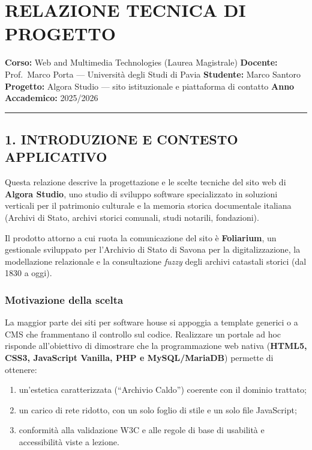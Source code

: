 \documentclass[
  11pt,
]{article}
\author{}
\date{}
\providecommand{\tightlist}{%
  \setlength{\itemsep}{0pt}\setlength{\parskip}{0pt}}
\begin{document}
\hypertarget{relazione-tecnica-di-progetto}{%
\section{RELAZIONE TECNICA DI
PROGETTO}\label{relazione-tecnica-di-progetto}}

\textbf{Corso:} Web and Multimedia Technologies (Laurea Magistrale)
\textbf{Docente:} Prof.~Marco Porta --- Università degli Studi di Pavia
\textbf{Studente:} Marco Santoro \textbf{Progetto:} Algora Studio ---
sito istituzionale e piattaforma di contatto \textbf{Anno Accademico:}
2025/2026

\begin{center}\rule{0.5\linewidth}{0.5pt}\end{center}

\hypertarget{introduzione-e-contesto-applicativo}{%
\subsection{1. INTRODUZIONE E CONTESTO
APPLICATIVO}\label{introduzione-e-contesto-applicativo}}

Questa relazione descrive la progettazione e le scelte tecniche del sito
web di \textbf{Algora Studio}, uno studio di sviluppo software
specializzato in soluzioni verticali per il patrimonio culturale e la
memoria storica documentale italiana (Archivi di Stato, archivi storici
comunali, studi notarili, fondazioni).

Il prodotto attorno a cui ruota la comunicazione del sito è
\textbf{Foliarium}, un gestionale sviluppato per l'Archivio di Stato di
Savona per la digitalizzazione, la modellazione relazionale e la
consultazione \emph{fuzzy} degli archivi catastali storici (dal 1830 a
oggi).

\hypertarget{motivazione-della-scelta}{%
\subsubsection{Motivazione della
scelta}\label{motivazione-della-scelta}}

La maggior parte dei siti per software house si appoggia a template
generici o a CMS che frammentano il controllo sul codice. Realizzare un
portale ad hoc risponde all'obiettivo di dimostrare che la
programmazione web nativa (\textbf{HTML5, CSS3, JavaScript Vanilla, PHP
e MySQL/MariaDB}) permette di ottenere:

\begin{enumerate}
\def\labelenumi{\arabic{enumi}.}
\tightlist
\item
  un'estetica caratterizzata (``Archivio Caldo'') coerente con il
  dominio trattato;
\item
  un carico di rete ridotto, con un solo foglio di stile e un solo file
  JavaScript;
\item
  conformità alla validazione W3C e alle regole di base di usabilità e
  accessibilità viste a lezione.
\end{enumerate}
\end{document}
